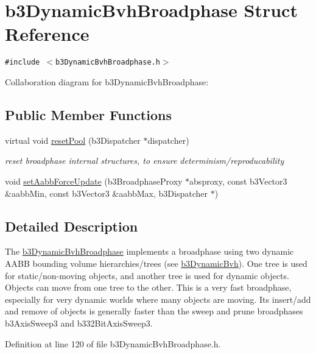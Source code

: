 \hypertarget{structb3_dynamic_bvh_broadphase}{
\section{b3DynamicBvhBroadphase Struct Reference}
\label{structb3_dynamic_bvh_broadphase}
}
{\tt \#include $<$b3DynamicBvhBroadphase.h$>$}

Collaboration diagram for b3DynamicBvhBroadphase:\subsection*{Public Member Functions}
\begin{CompactItemize}
\item 
\hypertarget{structb3_dynamic_bvh_broadphase_a14412970c0f564d3a659710c6d7a4dd}{
virtual void \hyperlink{structb3_dynamic_bvh_broadphase_a14412970c0f564d3a659710c6d7a4dd}{resetPool} (b3Dispatcher $\ast$dispatcher)}
\label{structb3_dynamic_bvh_broadphase_a14412970c0f564d3a659710c6d7a4dd}

\begin{CompactList}\small\item\em reset broadphase internal structures, to ensure determinism/reproducability \item\end{CompactList}\item 
void \hyperlink{structb3_dynamic_bvh_broadphase_c18c206ccd45e8e2f0c817381d6840a0}{setAabbForceUpdate} (b3BroadphaseProxy $\ast$absproxy, const b3Vector3 \&aabbMin, const b3Vector3 \&aabbMax, b3Dispatcher $\ast$)
\end{CompactItemize}


\subsection{Detailed Description}
The \hyperlink{structb3_dynamic_bvh_broadphase}{b3DynamicBvhBroadphase} implements a broadphase using two dynamic AABB bounding volume hierarchies/trees (see \hyperlink{structb3_dynamic_bvh}{b3DynamicBvh}). One tree is used for static/non-moving objects, and another tree is used for dynamic objects. Objects can move from one tree to the other. This is a very fast broadphase, especially for very dynamic worlds where many objects are moving. Its insert/add and remove of objects is generally faster than the sweep and prune broadphases b3AxisSweep3 and b332BitAxisSweep3. 

Definition at line 120 of file b3DynamicBvhBroadphase.h.

